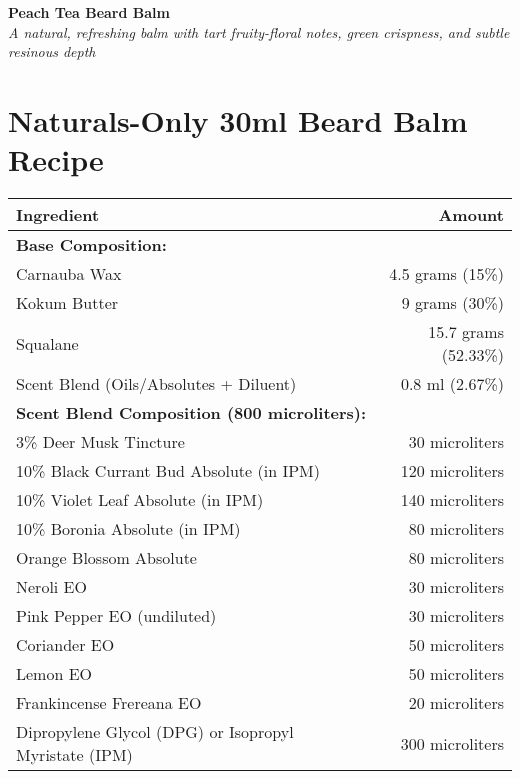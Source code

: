 \documentclass{article}
\begin{document}
\begin{center}
\textcolor{violetPurple}{\LARGE\textbf{Peach Tea Beard Balm}}\\[0.5cm]
\textcolor{colaBrown}{\large\textit{A natural, refreshing balm with tart fruity-floral notes, green crispness, and subtle resinous depth}}\\[0.5cm]
\end{center}

\section*{Naturals-Only 30ml Beard Balm Recipe}

\begin{center}
\begin{tabular}{p{6.5cm}r}
\toprule
\textcolor{colaRed}{\textbf{Ingredient}} & \textcolor{colaRed}{\textbf{Amount}} \\
\midrule
\multicolumn{2}{l}{\textcolor{violetPurple}{\textbf{Base Composition:}}} \\
\midrule
Carnauba Wax & 4.5 grams (15\%) \\
Kokum Butter & 9 grams (30\%) \\
Squalane & 15.7 grams (52.33\%) \\
Scent Blend (Oils/Absolutes + Diluent) & 0.8 ml (2.67\%) \\
\midrule
\multicolumn{2}{l}{\textcolor{violetPurple}{\textbf{Scent Blend Composition (800 microliters):}}} \\
\midrule
3\% Deer Musk Tincture & 30 microliters \\
10\% Black Currant Bud Absolute (in IPM) & 120 microliters \\
10\% Violet Leaf Absolute (in IPM) & 140 microliters \\
10\% Boronia Absolute (in IPM) & 80 microliters \\
Orange Blossom Absolute & 80 microliters \\
Neroli EO & 30 microliters \\
Pink Pepper EO (undiluted) & 30 microliters \\
Coriander EO & 50 microliters \\
Lemon EO & 50 microliters \\
Frankincense Frereana EO & 20 microliters \\
Dipropylene Glycol (DPG) or Isopropyl Myristate (IPM) & 300 microliters \\
\bottomrule
\end{tabular}
\end{center}
\end{document}
